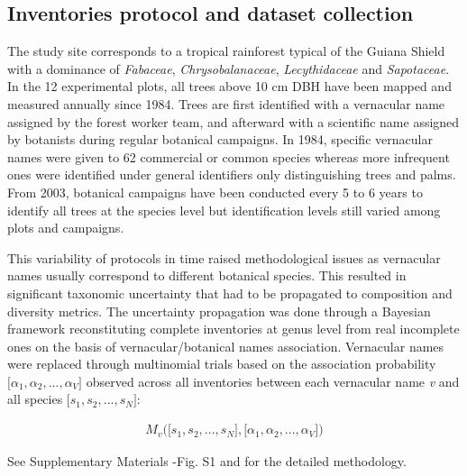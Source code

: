 \documentclass[fleqn,10pt]{ArtEcoFoG} %
\begin{document}
\subsection{Inventories protocol and dataset
collection}\label{inventories-protocol-and-dataset-collection}

The study site corresponds to a tropical rainforest typical of the
Guiana Shield with a dominance of \emph{Fabaceae},
\emph{Chrysobalanaceae}, \emph{Lecythidaceae} and \emph{Sapotaceae}. In
the 12 experimental plots, all trees above 10 cm DBH have been mapped
and measured annually since 1984. Trees are first identified with a
vernacular name assigned by the forest worker team, and afterward with a
scientific name assigned by botanists during regular botanical
campaigns. In 1984, specific vernacular names were given to 62
commercial or common species whereas more infrequent ones were
identified under general identifiers only distinguishing trees and
palms. From 2003, botanical campaigns have been conducted every 5 to 6
years to identify all trees at the species level but identification
levels still varied among plots and campaigns.

This variability of protocols in time raised methodological issues as
vernacular names usually correspond to different botanical species. This
resulted in significant taxonomic uncertainty that had to be propagated
to composition and diversity metrics. The uncertainty propagation was
done through a Bayesian framework reconstituting complete inventories at
genus level from real incomplete ones on the basis of
vernacular/botanical names association. Vernacular names were replaced
through multinomial trials based on the association probability
\(\big[\alpha_1, \alpha_2,..., \alpha_V\big]\) observed across all
inventories between each vernacular name \emph{v} and all species
\(\big[s_1, s_2,..., s_N\big]\):

\begin{align}
M_v\Big(\big[s_1, s_2,..., s_N\big],\big[\alpha_1, \alpha_2,..., \alpha_V\big]\Big) \nonumber
\end{align}

See Supplementary Materials -Fig. S1 and \citet{Aubry-Kientz2013} for
the detailed methodology.
\end{document}
